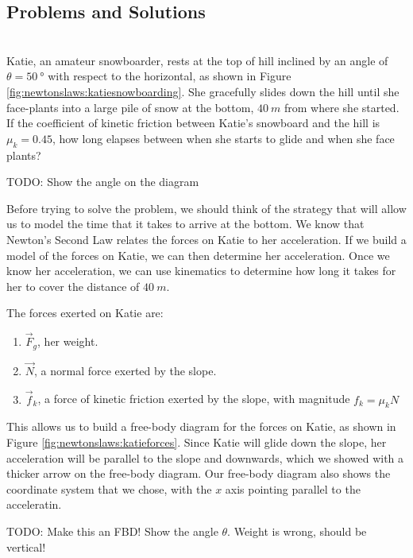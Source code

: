\subsection{Problems and Solutions}
 \vspace{0.25cm}
\begin{problem}\\ Katie, an amateur snowboarder, rests at the top of hill inclined by an angle of $\theta =\SI{50}{\degree}$ with respect to the horizontal, as shown in Figure \ref{fig:newtonslaws:katiesnowboarding}. She gracefully slides down the hill until she face-plants into a large pile of snow at the bottom, $\SI{40}{m}$ from where she started. If the coefficient of kinetic friction between Katie's snowboard and the hill is $\mu_k=0.45$, how long elapses between when she starts to glide and when she face plants?

TODO: Show the angle on the diagram

Before trying to solve the problem, we should think of the strategy that will allow us to model the time that it takes to arrive at the bottom. We know that Newton's Second Law relates the forces on Katie to her acceleration. If we build a model of the forces on Katie, we can then determine her acceleration. Once we know her acceleration, we can use kinematics to determine how long it takes for her to cover the distance of $\SI{40}{m}$.

The forces exerted on Katie are:
\begin{enumerate}
\item $\vec F_g$, her weight.
\item $\vec N$, a normal force exerted by the slope.
\item $\vec f_k$, a force of kinetic friction exerted by the slope, with magnitude $f_k=\mu_kN$ 
\end{enumerate}

This allows us to build a free-body diagram for the forces on Katie, as shown in Figure \ref{fig:newtonslaws:katieforces}. Since Katie will glide down the slope, her acceleration will be parallel to the slope and downwards, which we showed with a thicker arrow on the free-body diagram. Our free-body diagram also shows the coordinate system that we chose, with the $x$ axis pointing parallel to the acceleratin. 


TODO: Make this an FBD! Show the angle $\theta$. Weight is wrong, should be vertical!


\end{problem}
